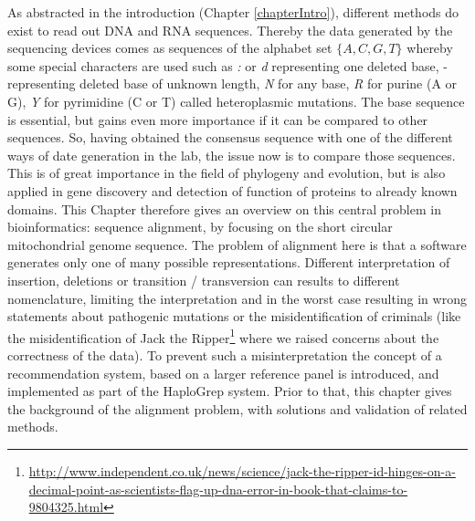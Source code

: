 As abstracted in the introduction (Chapter \ref{chapterIntro}), different methods do exist to read out DNA and RNA sequences. Thereby the data generated by the sequencing devices comes as sequences of the alphabet set \(\{A, C, G, T\}\) whereby some special characters are used such as \textit{:} or \textit{d} representing one deleted base, - representing deleted base of unknown length, \textit{N} for any base, \textit{R} for purine (A or G), \textit{Y} for pyrimidine (C or T) called heteroplasmic mutations. The base sequence is essential, but gains even more importance if it can be compared to other sequences. So, having obtained the consensus sequence with one of the different ways of date generation in the lab, the issue now is to compare those sequences. This is of great importance in the field of phylogeny and evolution, but is also applied in gene discovery and detection of function of proteins to already known domains. This Chapter therefore gives an overview on this central problem in bioinformatics: sequence alignment, by focusing on the short circular mitochondrial genome sequence. The problem of alignment here is that a software generates only one of many possible representations. Different interpretation of insertion, deletions or transition / transversion can results to different nomenclature, limiting the interpretation and in the worst case resulting in wrong statements about pathogenic mutations or the misidentification of criminals (like the misidentification of Jack the Ripper\footnote{\url{http://www.independent.co.uk/news/science/jack-the-ripper-id-hinges-on-a-decimal-point-as-scientists-flag-up-dna-error-in-book-that-claims-to-9804325.html}} where we raised concerns about the correctness of the data). To prevent such a misinterpretation the concept of a recommendation system, based on a larger reference panel is introduced, and implemented as part of the HaploGrep system. Prior to that, this chapter gives the background of the alignment problem, with solutions and validation of related methods.

